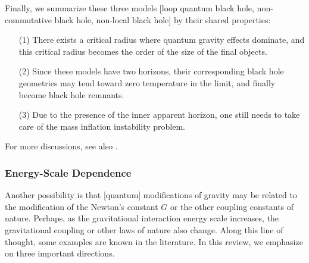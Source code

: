 \documentclass[12pt]{article}
\newcommand{\2}{$^2$}
\newcommand{\3}{$^3$}
\newcommand{\4}{$_4$}
\newcommand{\5}{$_5$}
\begin{document}
Finally, we summarize these three models [loop quantum black hole, non-commutative black hole, non-local black hole] by their shared properties:
\begin{itemize}
\item[(1)] There exists a critical radius where quantum gravity effects dominate, and this critical radius becomes the order of the size of the final objects.
\item[(2)] Since these models have two horizons, their corresponding black hole geometries may tend toward zero temperature in the limit, and finally become black hole remnants.
\item[(3)] Due to the presence of the inner apparent horizon, one still needs to take care of the mass inflation instability problem.
\end{itemize}

For more discussions, see also \cite{1410.1706}.

\subsubsection{Energy-Scale Dependence}

Another possibility is that [quantum] modifications of gravity may be related to the modification of the Newton's constant $G$ or the other coupling constants of nature. Perhaps, as the gravitational interaction energy scale increases, the gravitational coupling or other laws of nature also change. Along this line of thought, some examples are known in the literature. In this review,  we emphasize on three important directions.
\end{document}

